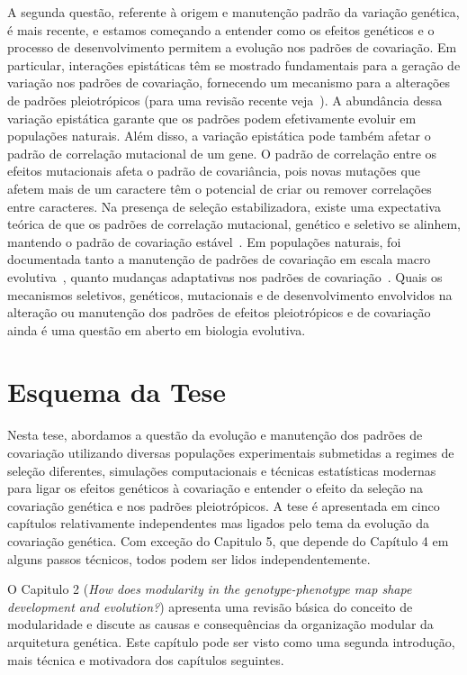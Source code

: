 \begin{refsection}
A segunda questão, referente à origem e manutenção padrão da variação
genética, é mais recente, e estamos começando a entender como os efeitos genéticos
e o processo de desenvolvimento permitem a evolução nos padrões de covariação.
Em particular, interações epistáticas têm se mostrado fundamentais para a
geração de variação nos padrões de covariação, fornecendo um mecanismo para a
alterações de padrões pleiotrópicos (para uma revisão recente
veja~\textcite{Pavlicev2015-up}). A abundância dessa variação epistática
garante que os padrões podem efetivamente evoluir em populações naturais. Além
disso, a variação epistática pode também afetar o padrão de correlação
mutacional de um gene. O padrão de correlação entre os efeitos mutacionais
afeta o padrão de covariância, pois novas mutações que afetem mais de um
caractere têm o potencial de criar ou remover correlações entre caracteres. Na
presença de seleção estabilizadora, existe uma expectativa teórica de que os
padrões de correlação mutacional, genético e seletivo se alinhem, mantendo o
padrão de covariação estável~\parencite{Cheverud1984-mi}. Em populações
naturais, foi documentada tanto a manutenção de padrões de covariação em
escala macro evolutiva~\parencite{Marroig2001-ne}, quanto mudanças
adaptativas nos padrões de covariação~\parencite{Young2005-nk}. Quais os
mecanismos seletivos, genéticos, mutacionais e de desenvolvimento envolvidos
na alteração ou manutenção dos padrões de efeitos pleiotrópicos e de
covariação ainda é uma questão em aberto em biologia evolutiva.

\section{Esquema da Tese} 

Nesta tese, abordamos a questão da evolução e manutenção dos padrões de
covariação utilizando diversas populações experimentais submetidas a regimes
de seleção diferentes, simulações computacionais e técnicas estatísticas
modernas para ligar os efeitos genéticos à covariação e entender o efeito da
seleção na covariação genética e nos padrões pleiotrópicos. A tese é
apresentada em cinco capítulos relativamente independentes mas ligados pelo
tema da evolução da covariação genética. Com exceção do Capitulo 5, que
depende do Capítulo 4 em alguns passos técnicos, todos podem ser lidos
independentemente.

O Capitulo 2 (\textit{How does modularity in the genotype-phenotype map shape
development and evolution?}) apresenta uma revisão básica do conceito de
modularidade e discute as causas e consequências da organização modular da
arquitetura genética. Este capítulo pode ser visto como uma segunda
introdução, mais técnica e motivadora dos capítulos seguintes.


\end{refsection}
